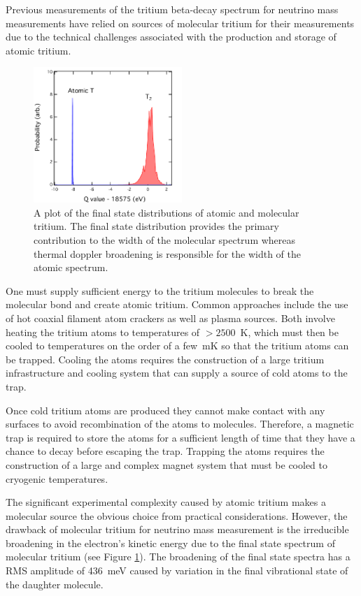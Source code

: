 Previous measurements of the tritium beta-decay spectrum for neutrino mass measurements have relied on  sources of molecular tritium for their measurements \cite{mainz_final,troitsk_result,KATRIN:2022kkv} due to the technical challenges associated with the production and storage of atomic tritium.

\begin{figure}[htbp]
    \centering
    \includegraphics*[width=0.5\textwidth]{figs/Chapter-3/atmol2.pdf}
    \caption{\label{fig:chap3-atomic-vs-mol-final-state-spectra} A plot of the final state distributions of atomic and molecular tritium. The final state distribution provides the primary contribution to the width of the molecular spectrum whereas thermal doppler broadening is responsible for the width of the atomic spectrum.}
\end{figure}

One must supply sufficient energy to the tritium molecules to break the molecular bond and create atomic tritium. Common approaches include the use of hot coaxial filament atom crackers as well as plasma sources. Both involve heating the tritium atoms to temperatures of $>2500$~K, which must then be cooled to temperatures on the order of a few~mK so that the tritium atoms can be trapped. Cooling the atoms requires the construction of a large tritium infrastructure and cooling system that can supply a source of cold atoms to the trap. 

Once cold tritium atoms are produced they cannot make contact with any surfaces to avoid recombination of the atoms to molecules. Therefore, a magnetic trap is required to store the atoms for a sufficient length of time that they have a chance to decay before escaping the trap. Trapping the atoms requires the construction of a large and complex magnet system that must be cooled to cryogenic temperatures.

The significant experimental complexity caused by atomic tritium makes a molecular source the obvious choice from practical considerations. However, the drawback of molecular tritium for neutrino mass measurement is the irreducible broadening in the electron's kinetic energy due to the final state spectrum of molecular tritium (see Figure \ref{fig:chap3-atomic-vs-mol-final-state-spectra}). The broadening of the final state spectra has a RMS amplitude of 436~meV \cite{tritium_final_state_saenz, Bodine:2015sma} caused by variation in the final vibrational state of the daughter molecule.

